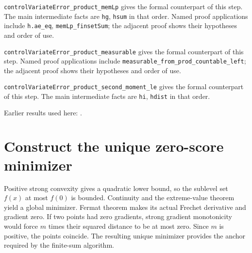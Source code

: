 \documentclass[11pt,a4paper]{article}
\begin{document}
\begin{leanbox}
\texttt{control\allowbreak{}Variate\allowbreak{}Error\_\allowbreak{}product\_\allowbreak{}mem\allowbreak{}Lp} gives the formal counterpart of this step. The main intermediate facts are \texttt{hg}, \texttt{hsum} in that order. Named proof applications include \texttt{h.\allowbreak{}ae\_\allowbreak{}eq}, \texttt{mem\allowbreak{}Lp\_\allowbreak{}finset\allowbreak{}Sum}; the adjacent proof shows their hypotheses and order of use.




\texttt{control\allowbreak{}Variate\allowbreak{}Error\_\allowbreak{}product\_\allowbreak{}measurable} gives the formal counterpart of this step. Named proof applications include \texttt{measurable\_\allowbreak{}from\_\allowbreak{}prod\_\allowbreak{}countable\_\allowbreak{}left}; the adjacent proof shows their hypotheses and order of use.




\texttt{control\allowbreak{}Variate\allowbreak{}Error\_\allowbreak{}product\_\allowbreak{}second\_\allowbreak{}moment\_\allowbreak{}le} gives the formal counterpart of this step. The main intermediate facts are \texttt{hi}, \texttt{hdist} in that order.
\end{leanbox}


Earlier results used here: \cite[Section~3.13.4]{LangevinLean2026ULASC}.

\section{\texorpdfstring{Construct the unique zero-score minimizer}{Construct the unique zero-score minimizer}}


Positive strong convexity gives a quadratic lower bound, so the sublevel set \(f(x)\) at most \(f(0)\) is bounded. Continuity and the extreme-value theorem yield a global minimizer. Fermat theorem makes its actual Frechet derivative and gradient zero. If two points had zero gradients, strong gradient monotonicity would force \(m\) times their squared distance to be at most zero. Since \(m\) is positive, the points coincide. The resulting unique minimizer provides the anchor required by the finite-sum algorithm.
\end{document}
